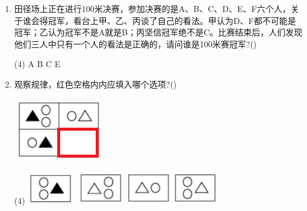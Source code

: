 \documentclass[10pt, a4paper]{article}
\begin{document}
\begin{enumerate}
        \item 田径场上正在进行100米决赛，参加决赛的是A、B、C、D、E、F六个人，关于谁会得冠军，看台上甲、乙、丙谈了自己的看法。甲认为D、F都不可能是冠军；乙认为冠军不是A就是B；丙坚信冠军绝不是C。比赛结束后，人们发现他们三人中只有一个人的看法是正确的，请问谁是100米赛冠军?(\qquad)
        \begin{tasks}(4)
            \task A
            \task B
            \task C
            \task E
        \end{tasks}

        \item 观察规律，红色空格内内应填入哪个选项?(\qquad)
        
        \begin{minipage}{.2\textwidth}
            \includegraphics[width=.5\textwidth]{15.png}
        \end{minipage}
        \begin{minipage}{.7\textwidth}
            \begin{tasks}(4)
                \task \includegraphics[width=.12\textwidth]{15a.png}
                \task \includegraphics[width=.12\textwidth]{15b.png}
                \task \includegraphics[width=.12\textwidth]{15c.png}
                \task \includegraphics[width=.12\textwidth]{15d.png}
            \end{tasks}
        \end{minipage}


\end{enumerate}
\end{document}
